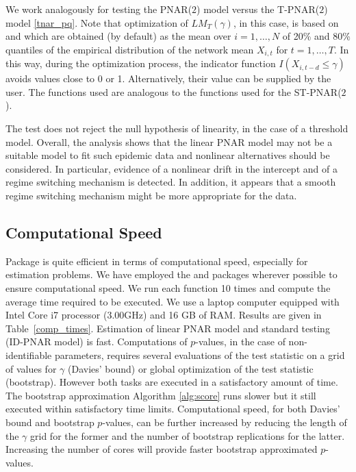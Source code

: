 We work analogously  for testing the   PNAR($2$) model versus the T-PNAR($2$) model \eqref{tnar_pq}.
Note that  optimization of $LM_T(\gamma)$, in this case, is based on    and  which are obtained (by default) as the mean over $i = 1, \dots,N$ of 20\% and 80\% quantiles of the empirical distribution of the network mean $X_{i,t}$ for $t = 1, \dots,T$. In this way, during the optimization process, the indicator function $I(X_{i,t-d} \leq \gamma)$ avoids values close  to 0 or 1. Alternatively, their value can be supplied by the user. The functions used are analogous to the functions used for the ST-PNAR($2$).


\noindent
The test does not reject the null hypothesis of linearity, in the case of a threshold model. Overall, the analysis shows that the linear PNAR model may not be a suitable  model to fit such epidemic data and nonlinear alternatives should be considered. In particular, evidence of a nonlinear drift in the intercept and of a regime switching mechanism is detected. In addition, it appears that a smooth regime switching mechanism might be more appropriate for the data.

\subsection{Computational Speed}

Package  is quite efficient in terms of computational speed, especially for estimation problems. We have employed the  and  packages \citep{Rfast,Rfast2} wherever possible to ensure computational speed.
We run each function 10 times and compute the average time required to be executed. We use a laptop  computer equipped with  Intel Core i7 processor (3.00GHz) and 16 GB of RAM. Results are given in  Table~\ref{comp_times}.
Estimation of  linear PNAR model  and standard testing (ID-PNAR model) is fast.  
Computations of $p$-values, in the case of non-identifiable parameters,   requires several evaluations of the test statistic on a grid of values for $\gamma$ (Davies' bound) or global optimization of the test statistic (bootstrap). However both tasks are executed in a satisfactory amount of time. The bootstrap approximation Algorithm \ref{alg:score}  runs slower  but it still executed within satisfactory time limits.  Computational  speed, for both Davies' bound and bootstrap $p$-values, can be further increased by reducing the length of the $\gamma$ grid for the former  and the number of bootstrap replications for the latter.  Increasing the number of cores will provide faster bootstrap approximated $p$-values. 

